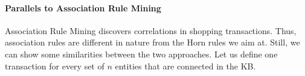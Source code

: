 
\paragraph{Parallels to Association Rule Mining} 
Association Rule Mining discovers correlations in shopping transactions. 
Thus, association rules are different in nature from the Horn rules we aim at.
Still, we can show some similarities between the two approaches. Let us define one transaction for every set of $n$ entities that are connected in the KB.
